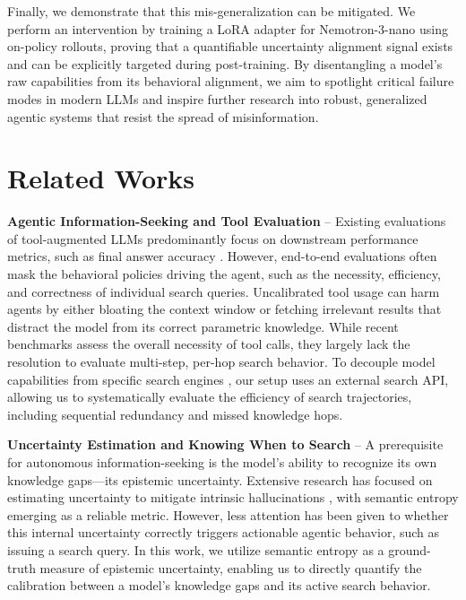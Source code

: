 \documentclass[10pt, letterpaper]{article}
\begin{document}
Finally, we demonstrate that this mis-generalization can be mitigated. We perform an intervention by training a LoRA adapter for Nemotron-3-nano using on-policy rollouts, proving that a quantifiable uncertainty alignment signal exists and can be explicitly targeted during post-training. By disentangling a model's raw capabilities from its behavioral alignment, we aim to spotlight critical failure modes in modern LLMs and inspire further research into robust, generalized agentic systems that resist the spread of misinformation.

\section{Related Works}

\textbf{Agentic Information-Seeking and Tool Evaluation} -- Existing evaluations of tool-augmented LLMs predominantly focus on downstream performance metrics, such as final answer accuracy \cite{wei_browsecomp_nodate, cheng_facts_2025, trivedi__2022}. However, end-to-end evaluations often mask the behavioral policies driving the agent, such as the necessity, efficiency, and correctness of individual search queries. Uncalibrated tool usage can harm agents by either bloating the context window or fetching irrelevant results that distract the model from its correct parametric knowledge. While recent benchmarks \cite{ning_wtu-eval_2024, lu_toolsandbox_2025} assess the overall necessity of tool calls, they largely lack the resolution to evaluate multi-step, per-hop search behavior. To decouple model capabilities from specific search engines \cite{cheng_facts_2025}, our setup uses an external search API, allowing us to systematically evaluate the efficiency of search trajectories, including sequential redundancy and missed knowledge hops.

\textbf{Uncertainty Estimation and Knowing When to Search} -- A prerequisite for autonomous information-seeking is the model's ability to recognize its own knowledge gaps---its epistemic uncertainty. Extensive research has focused on estimating uncertainty to mitigate intrinsic hallucinations \cite{yona_can_2024, raj_measuring_2023, farquhar_detecting_2024}, with semantic entropy emerging as a reliable metric. However, less attention has been given to whether this internal uncertainty correctly triggers actionable agentic behavior, such as issuing a search query. In this work, we utilize semantic entropy as a ground-truth measure of epistemic uncertainty, enabling us to directly quantify the calibration between a model's knowledge gaps and its active search behavior.
\end{document}
